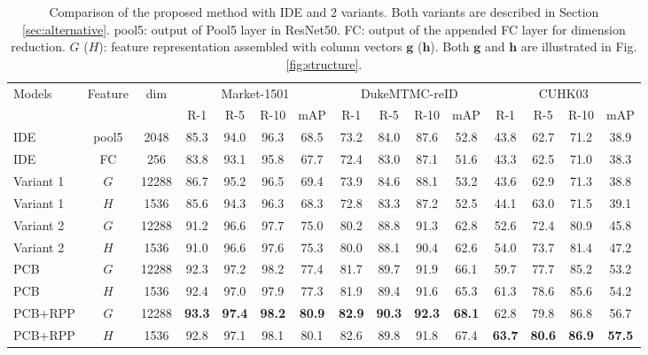 \documentclass[10pt,twocolumn,letterpaper]{article}
\begin{document}
\begin{table*}[]
\setlength{\abovecaptionskip}{-0.1cm}
\setlength{\belowcaptionskip}{-0.2cm}
\begin{center}
\begin{tabular}{l|c|c|c c c c|c c c c|c c c c}
\hline
\multicolumn{1}{l|}{\multirow{2}{*}{Models }}&\multicolumn{1}{c|}{\multirow{2}{*}{Feature}}&\multicolumn{1}{c|}{\multirow{2}{*}{dim}}&\multicolumn{4}{c|}{Market-1501} & \multicolumn{4}{c|}{DukeMTMC-reID} & \multicolumn{4}{c}{CUHK03}\\ 
\cline{4-15}
\multicolumn{1}{c|}{}&\multicolumn{1}{c|}{}&&\multicolumn{1}{c}{R-1}&{R-5}&{R-10}&{mAP}&{R-1}&{R-5}&{R-10}&{mAP}&{R-1}&{R-5}&{R-10}&{mAP}\\
\hline
IDE& pool5 & 2048 &85.3&94.0&96.3&68.5  &73.2&84.0&87.6& 52.8  &43.8&62.7&71.2&38.9\\
IDE& FC & 256 &83.8&93.1&95.8&67.7  &72.4& 83.0&87.1& 51.6   &43.3&62.5&71.0&38.3\\ 

Variant 1& $G$ &12288 &86.7&95.2&96.5&69.4 &73.9&84.6&88.1& 53.2 &43.6&62.9&71.3&38.8\\
Variant 1& ${H}$ &1536 &85.6&94.3&96.3&68.3 &72.8&83.3&87.2& 52.5 &44.1&63.0&71.5&39.1\\

Variant 2 &${G}$ &12288 &91.2&96.6&97.7&75.0 &80.2&88.8&91.3&62.8    &52.6&72.4&80.9 &45.8\\
Variant 2 &${H}$ &1536 &91.0&96.6&97.6&75.3 &80.0&88.1&90.4&62.6     &54.0&73.7&81.4&47.2\\

\hline
PCB &${G}$ &12288    &92.3&97.2&98.2&77.4    &81.7&89.7&91.9&66.1    &59.7&77.7&85.2&53.2\\
PCB &${H}$ &1536    &92.4&97.0&97.9&77.3   &81.9&89.4&91.6&65.3     &61.3&78.6&85.6&54.2\\

PCB+RPP& ${G}$ & 12288   &\textbf{93.3}&\textbf{97.4}&\textbf{98.2}&\textbf{80.9}    &\textbf{82.9}&\textbf{90.3}&\textbf{92.3}&\textbf{68.1}     &62.8&79.8&86.8&56.7\\
PCB+RPP &${H}$ & 1536  &92.8&97.1&98.1&80.1   &82.6&89.8&91.8&67.4      &\textbf{63.7}&\textbf{80.6}&\textbf{86.9}&\textbf{57.5}\\

\hline 
\end{tabular}
\end{center}
\caption{Comparison of the proposed method with IDE and 2 variants. Both variants are described in Section \ref{sec:alternative}. pool5: output of Pool5 layer in ResNet50. FC: output of the appended FC layer for dimension reduction.  ${G}$ ($H$): feature representation assembled with column vectors $\bm{g}$ ($\bm{h}$). Both $\bm{g}$ and $\bm{h}$ are illustrated in Fig. \ref{fig:structure}.}
\label{table:cmpbasl}
\end{table*}
\end{document}
